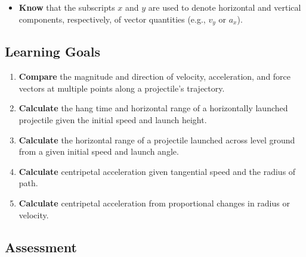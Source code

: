 \documentclass[dvipsnames]{article}
\begin{document}
\begin{itemize}[itemsep=0pt]
    \item \textbf{Know} that the subscripts $x$ and $y$ are used to denote horizontal and vertical components, respectively, of vector quantities (e.g., $v_y$ or $a_x$).
\end{itemize}



\subsection*{Learning Goals}

\begin{enumerate}[itemsep=0pt]
    \item \textbf{Compare} the magnitude and direction of velocity, acceleration, and force vectors at multiple points along a projectile's trajectory.
    \item \textbf{Calculate} the hang time and horizontal range of a horizontally launched projectile given the initial speed and launch height.
    \item \textbf{Calculate} the horizontal range of a projectile launched across level ground from a given initial speed and launch angle.
    \item \textbf{Calculate} centripetal acceleration given tangential speed and the radius of path.
    \item \textbf{Calculate} centripetal acceleration from proportional changes in radius or velocity.
\end{enumerate}

\subsection*{Assessment}
\end{document}

